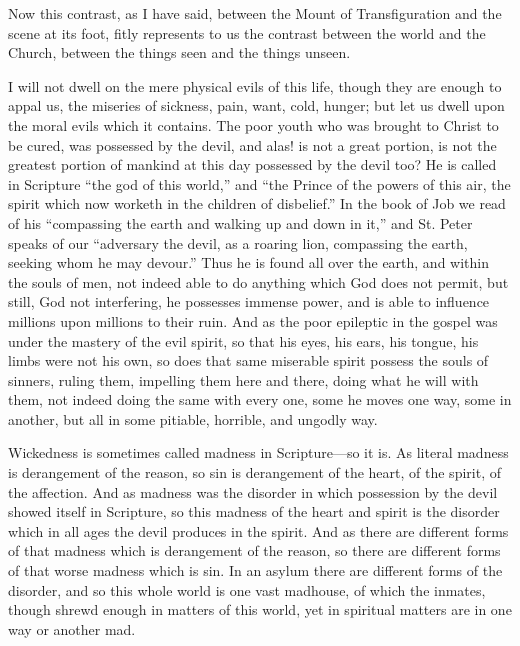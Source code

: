 Now this contrast, as I have said, between the
Mount of Transfiguration and the scene at its foot, fitly represents
to us the contrast between the world and the Church, between the
things seen and the things unseen.

I will not dwell on the mere physical evils of
this life, though they are enough to appal us, the miseries of
sickness, pain, want, cold, hunger; but let us dwell upon the moral
evils which it contains. The poor youth who was brought to Christ to
be cured, was possessed by the devil, and alas! is not a great
portion, is not the greatest portion of mankind at this day possessed
by the devil too? He is called in Scripture ``the god of this world,''
and ``the Prince of the powers of this air, the spirit which now
worketh in the children of disbelief.'' In the book of Job we read of
his ``compassing the earth and walking up and down in it,'' and St.
Peter speaks of our ``adversary the devil, as a roaring lion,
compassing the earth, seeking whom he may devour.'' Thus he is found
all over the earth, and within the souls of men, not indeed able to do
anything which God does not permit, but still, God not interfering, he
possesses immense power, and is able to influence millions upon
millions to their ruin. And as the poor epileptic in the gospel was
under the mastery of the evil spirit, so that his eyes, his ears, his
tongue, his limbs were not his own, so does that same miserable spirit
possess the souls of sinners, ruling them, impelling them here and
there, doing what he will with them, not indeed doing the same with
every one, some he moves one way, some in another, but all in some
pitiable, horrible, and ungodly way.

Wickedness is sometimes called madness in
Scripture—so it is. As literal madness is derangement of the reason,
so sin is derangement of the heart, of the spirit, of the affection.
And as madness was the disorder in which possession by the devil
showed itself in Scripture, so this madness of the heart and spirit is
the disorder which in all ages the devil produces in the spirit. And
as there are different forms of that madness which is derangement of
the reason, so there are different forms of that worse madness which
is sin. In an asylum there are different forms of the disorder, and so
this whole world is one vast madhouse, of which the inmates, though
shrewd enough in matters of this world, yet in spiritual matters are
in one way or another mad.

